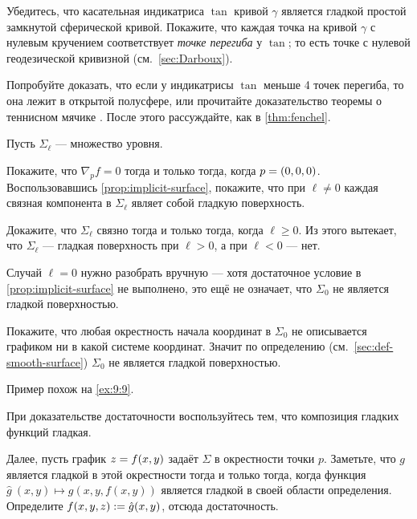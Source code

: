 \begin{multicols}{2}
Убедитесь, что касательная индикатриса $\tan$ кривой $\gamma$ является гладкой простой замкнутой сферической кривой.
Покажите, что каждая точка на кривой $\gamma$ с нулевым кручением соответствует \emph{точке перегиба} у $\tan$;
то есть точке с нулевой геодезической кривизной (см.~\ref{sec:Darboux}).

Попробуйте доказать, что если у индикатрисы $\tan$ меньше 4 точек перегиба, то она лежит в открытой полусфере,
или прочитайте доказательство теоремы о теннисном мячике \cite[§ 20]{arnold1994}.
После этого рассуждайте, как в \ref{thm:fenchel}.


\setcounter{eqtn}{0}

Пусть $\Sigma_\ell$ --- множество уровня.

Покажите, что $\nabla_p f=0$ тогда и только тогда, когда $p\z=(0,0,0)$.
Воспользовавшись \ref{prop:implicit-surface}, покажите, что при $\ell\ne 0$ каждая связная компонента в $\Sigma_\ell$ являет собой гладкую поверхность.

Докажите, что $\Sigma_\ell$ связно тогда и только тогда, когда $\ell\ge 0$.
Из этого вытекает, что $\Sigma_\ell$ --- гладкая поверхность при $\ell>0$, а при $\ell<0$ --- нет.

Случай $\ell=0$ нужно разобрать вручную --- хотя достаточное условие в \ref{prop:implicit-surface} не выполнено, это ещё не означает, что $\Sigma_0$ не является гладкой поверхностью.

Покажите, что любая окрестность начала координат в $\Sigma_0$ не описывается графиком ни в какой системе координат.
Значит по определению (см.~\ref{sec:def-smooth-surface}) $\Sigma_0$ не является гладкой поверхностью.

Пример похож на \ref{ex:9:9}.

При доказательстве достаточности воспользуйтесь тем, что композиция гладких функций гладкая.

Далее, пусть график $z\z=f(x,y)$ задаёт $\Sigma$ в окрестности точки $p$.
Заметьте, что $g$ является гладкой в этой окрестности тогда и только тогда, когда функция $\hat g\:(x,y)\mapsto g(x,y,f(x,y))$ является гладкой в своей области определения.
Определите $f(x,y,z)\z\df \hat g(x,y)$, отсюда достаточность.


\end{multicols}
